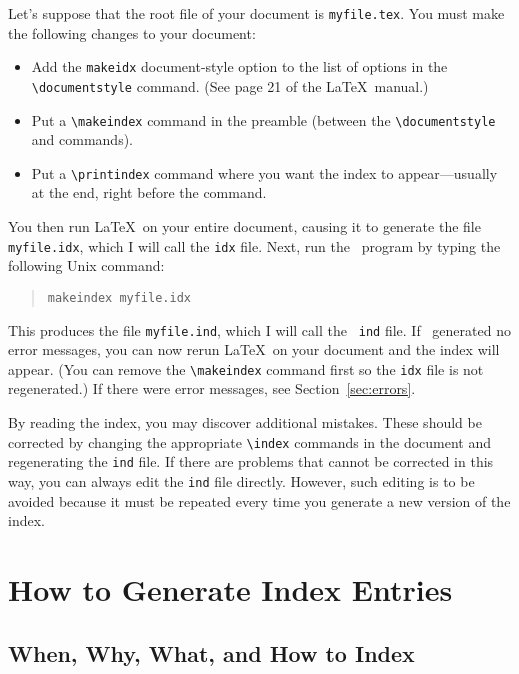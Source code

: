Let's suppose that the root file of your document is {\tt myfile.tex}.
You must make the following changes to your document:
\begin{itemize}
 
\item Add the {\tt makeidx} document-style option to the list of
options in the \verb|\documentstyle| command.  (See page 21 of the
\LaTeX\ manual.)
 
\item Put a \verb|\makeindex| command in the preamble (between the
  \linebreak%
\verb|\documentstyle| and \verb|| commands).
 
\item Put a \verb|\printindex| command where you want the index to
appear---usually at the end, right before the \verb||
command.
\end{itemize}
You then run \LaTeX\ on your entire document, causing it to
generate the file {\tt myfile.idx}, which I will call the {\tt idx} file.
Next, run the \MakeIndex\ program by
typing the following Unix command:
\begin{quote}
    {\tt makeindex myfile.idx}
\end{quote}
This produces the file {\tt myfile.ind}, which I will call the {\tt
ind} file.  If \MakeIndex\ generated no error messages, you can now rerun
\LaTeX\ on your document and the index will appear.  (You can remove
the \verb|\makeindex| command first so the {\tt idx} file is not
regenerated.)  If there were error messages, see
Section~\ref{sec:errors}.
 
By reading the index, you may discover additional mistakes.  These should be
corrected by changing the appropriate \verb|\index| commands in the
document and regenerating the {\tt ind} file.  If there are
problems that cannot be corrected in this way, you can always edit
the {\tt ind} file directly.  However, such editing is to be
avoided because it must be repeated every time you generate a new
version of the index.
 
 
\section{How to Generate Index Entries}
 
\subsection{When, Why, What, and How to Index}
 
